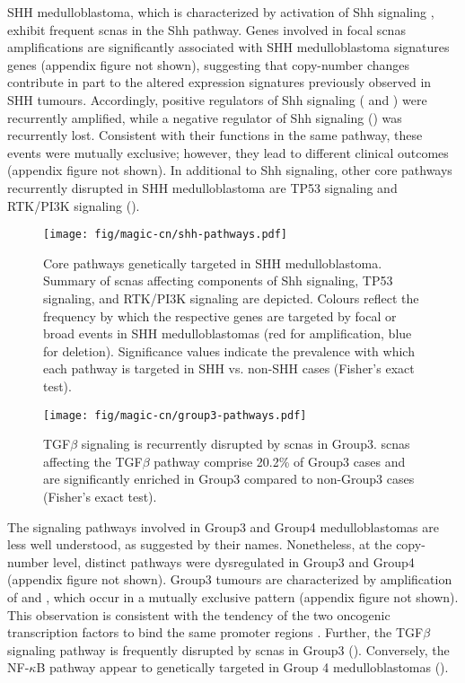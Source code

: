 SHH medulloblastoma, which is characterized by activation of Shh signaling , exhibit frequent \gls{scnas} in the Shh pathway. Genes involved in focal \gls{scnas} amplifications are significantly associated with SHH medulloblastoma signatures genes (appendix figure not shown), suggesting that copy-number changes contribute in part to the altered expression signatures previously observed in SHH tumours. Accordingly, positive regulators of Shh signaling ( and ) were recurrently amplified, while a negative regulator of Shh signaling () was recurrently lost. Consistent with their functions in the same pathway, these events were mutually exclusive; however, they lead to different clinical outcomes (appendix figure not shown). In additional to Shh signaling, other core pathways recurrently disrupted in SHH medulloblastoma are TP53 signaling and RTK/PI3K signaling ().

\begin{SCfigure}[5]
	\centering
	\texttt{[image: fig/magic-cn/shh-pathways.pdf]}
	\caption[Core pathways genetically targeted in SHH medulloblastoma]
	{
	Core pathways genetically targeted in SHH medulloblastoma.
	Summary of \gls{scnas} affecting components of Shh signaling, TP53 signaling, and RTK/PI3K signaling are depicted. Colours reflect the frequency by which the respective genes are targeted by focal or broad events in SHH medulloblastomas (red for amplification, blue for deletion). Significance values indicate the prevalence with which each pathway is targeted in SHH vs. non-SHH cases (Fisher's exact test).
	}
	\label{fig:shh-pathways}
\end{SCfigure}

\begin{SCfigure}[5][b]
	\centering
	\texttt{[image: fig/magic-cn/group3-pathways.pdf]}
	\caption[TGF$\beta$ signaling is recurrently disrupted by \gls{scnas} in Group3]
	{
	TGF$\beta$ signaling is recurrently disrupted by \gls{scnas} in Group3.
	\gls{scnas} affecting the TGF$\beta$ pathway comprise 20.2\% of Group3 cases and are significantly enriched in Group3 compared to non-Group3 cases (Fisher's exact test).
	}
	\label{fig:group3-pathways}
\end{SCfigure}

\clearpage

The signaling pathways involved in Group3 and Group4 medulloblastomas are less well understood, as suggested by their names. Nonetheless, at the copy-number level, distinct pathways were dysregulated in Group3 and Group4 (appendix figure not shown). Group3 tumours are characterized by amplification of  and , which occur in a mutually exclusive pattern (appendix figure not shown). This observation is consistent with the tendency of the two oncogenic transcription factors to bind the same promoter regions . Further, the TGF$\beta$ signaling pathway is frequently disrupted by \gls{scnas} in Group3 (). Conversely, the NF-$\kappa$B pathway appear to genetically targeted in Group 4 medulloblastomas ().

